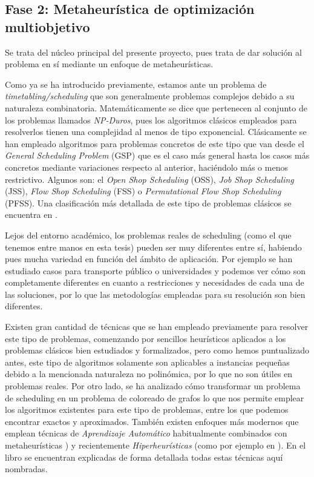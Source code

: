 \subsection{Fase 2: Metaheurística de optimización multiobjetivo} \label{sec:3:metaheurística}
Se trata del núcleo principal del presente proyecto, pues trata de dar solución al problema en sí mediante un enfoque de metaheurísticas.

Como ya se ha introducido previamente, estamos ante un problema de \textit{timetabling/scheduling} que son generalmente problemas complejos debido a su naturaleza combinatoria. 
Matemáticamente se dice que pertenecen al conjunto de los problemas llamados \textit{NP-Duros}, pues los algoritmos clásicos empleados para resolverlos tienen una complejidad al menos de tipo exponencial.
Clásicamente se han empleado algoritmos para problemas concretos de este tipo que van desde el \textit{General Scheduling Problem} (GSP) que es el caso más general hasta los casos más concretos mediante variaciones respecto al anterior, haciéndolo más o menos restrictivo. 
Algunos son: el \textit{Open Shop Scheduling} (OSS), \textit{Job Shop Scheduling} (JSS), \textit{Flow Shop Scheduling} (FSS) o \textit{Permutational Flow Shop Scheduling} (PFSS). Una clasificación más detallada de este tipo de problemas clásicos se encuentra en \cite{sota:tesis-doctoral}. 

Lejos del entorno académico, los problemas reales de scheduling (como el que tenemos entre manos en esta tesis) pueden ser muy diferentes entre sí, habiendo pues mucha variedad en función del ámbito de aplicación. 
Por ejemplo se han estudiado casos para transporte público \cite{sota:transporte-publico} o universidades \cite{sota:universidad} y podemos ver cómo son completamente diferentes en cuanto a restricciones y necesidades de cada una de las soluciones, por lo que las metodologías empleadas para su resolución son bien diferentes.

Existen gran cantidad de técnicas que se han empleado previamente para resolver este tipo de problemas, comenzando por sencillos heurísticos aplicados a los problemas clásicos bien estudiados y formalizados, pero como hemos puntualizado antes, este tipo de algoritmos solamente son aplicables a instancias pequeñas debido a la mencionada naturaleza no polinómica, por lo que no son útiles en problemas reales. Por otro lado, se ha analizado cómo transformar un problema de scheduling en un problema de coloreado de grafos \cite{sota:estudio-coloreado-grafos, sota:algotimo-coloreado-grafos} lo que nos permite emplear los algoritmos existentes para este tipo de problemas, entre los que podemos encontrar exactos y aproximados. También existen enfoques más modernos que emplean técnicas de \textit{Aprendizaje Automático} habitualmente combinados con metaheurísticas \cite{sota:machine-learning-geneticos}) y recientemente \textit{Hiperheurísticas} (como por ejemplo en \cite{sota:hiperheuristicas}). En el libro \cite{sota:libro-sota-scheduling} se encuentran explicadas de forma detallada todas estas técnicas aquí nombradas.

